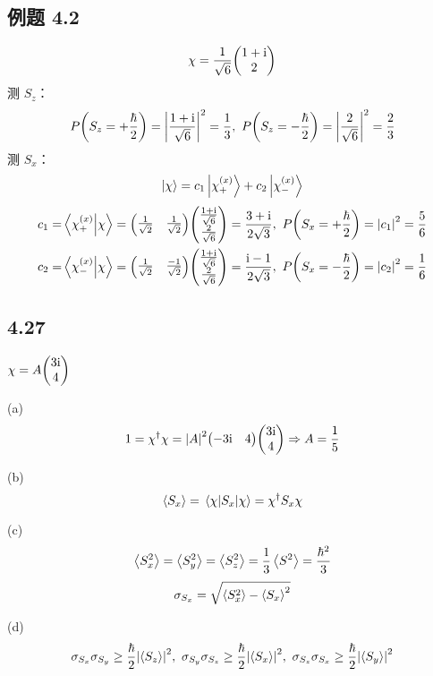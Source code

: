 \subsection{例题 4.2}
\begin{framed}
    \[
        \chi = \frac{1}{\sqrt{6}} \mqty(1 + \rmi \\ 2)
    \] 测 $S_z$：\[
        P\qty(S_z = + \frac{\hbar}{2}) = \qty|\frac{1 + \mathrm{i}}{\sqrt{6}}|^2 = \frac{1}{3},\ P\qty(S_z = - \frac{\hbar}{2}) = \qty|\frac{2}{\sqrt{6}}|^2 = \frac{2}{3}
    \] 测 $S_x$：\[
        \ket{\chi} = c_1 \ket{\chi_+^{(x)}} + c_2 \ket{\chi_-^{(x)}}
    \] \begin{align*}
        c_1 = & \braket{\chi_+^{(x)}}{\chi} = \mqty(\frac{1}{\sqrt{2}} & \frac{1}{\sqrt{2}}) \mqty(\frac{1 + \rmi}{\sqrt{6}}   \\ \frac{2}{\sqrt{6}}) = \frac{3 + \rmi}{2 \sqrt{3}},\ P\qty(S_x = + \frac{\hbar}{2}) = \qty|c_1|^2 = \frac{5}{6}\\
        c_2 = & \braket{\chi_-^{(x)}}{\chi} = \mqty(\frac{1}{\sqrt{2}} & \frac{- 1}{\sqrt{2}}) \mqty(\frac{1 + \rmi}{\sqrt{6}} \\ \frac{2}{\sqrt{6}}) = \frac{\rmi - 1}{2 \sqrt{3}},\ P\qty(S_x = - \frac{\hbar}{2}) = \qty|c_2|^2 = \frac{1}{6}
    \end{align*}
\end{framed}

\subsection{4.27}
\begin{framed}
    $\chi = A \mqty(3 \rmi \\ 4)$

    (a)
    \[
        1 = \chi^{\dagger} \chi = \qty|A|^2 \mqty(- 3 \rmi & 4) \mqty(3 \rmi \\ 4) \Rightarrow A = \frac{1}{5}
    \]

    (b)
    \[
        \expval{S_x} = \ev{S_x}{\chi} = \chi^{\dagger} S_x \chi
    \]

    (c)
    \[
        \expval{S_x^2} = \expval{S_y^2} = \expval{S_z^2} = \frac{1}{3} \expval{S^2} = \frac{\hbar^2}{3}
    \] \[
        \sigma_{S_x} = \sqrt{\expval{S_x^2} - \expval{S_x}^2}
    \]

    (d)
    \[
        \sigma_{S_x} \sigma_{S_y} \geq \frac{\hbar}{2} \qty|\expval{S_z}|^2,\ \sigma_{S_y} \sigma_{S_z} \geq \frac{\hbar}{2} \qty|\expval{S_x}|^2,\ \sigma_{S_z} \sigma_{S_x} \geq \frac{\hbar}{2} \qty|\expval{S_y}|^2
    \]
\end{framed}

